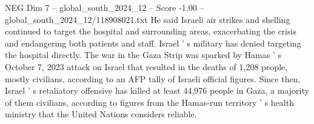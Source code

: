 \begin{textsample}{NEG Dim 7 – global\_south\_2024\_12 – Score -1.00 – global\_south\_2024\_12/118908021.txt}
He said Israeli air strikes and shelling continued to target the hospital and surrounding areas, exacerbating the crisis and endangering both patients and staff.
Israel ' s military has denied targeting the hospital directly.
The war in the Gaza Strip was sparked by Hamas ' s October 7, 2023 attack on Israel that resulted in the deaths of 1,208 people, mostly civilians, according to an AFP tally of Israeli official figures.
Since then, Israel ' s retaliatory offensive has killed at least 44,976 people in Gaza, a majority of them civilians, according to figures from the Hamas-run territory ' s health ministry that the United Nations considers reliable.

\end{textsample}
